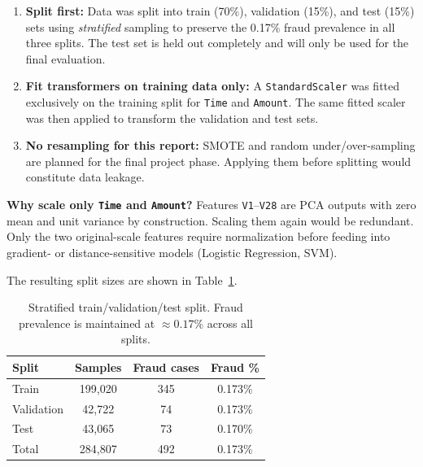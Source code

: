\documentclass[11pt, a4paper]{article}
\begin{document}
\begin{enumerate}[noitemsep]
    \item \textbf{Split first:} Data was split into train (70\%), validation (15\%), and
          test (15\%) sets using \textit{stratified} sampling to preserve the 0.17\% fraud
          prevalence in all three splits. The test set is held out completely and will only
          be used for the final evaluation.
    \item \textbf{Fit transformers on training data only:} A \texttt{StandardScaler} was
          fitted exclusively on the training split for \texttt{Time} and \texttt{Amount}.
          The same fitted scaler was then applied to transform the validation and test sets.
    \item \textbf{No resampling for this report:} SMOTE and random under/over-sampling are
          planned for the final project phase. Applying them before splitting would
          constitute data leakage.
\end{enumerate}

\noindent\textbf{Why scale only \texttt{Time} and \texttt{Amount}?}
Features \texttt{V1}--\texttt{V28} are PCA outputs with zero mean and unit variance by
construction. Scaling them again would be redundant. Only the two original-scale features
require normalization before feeding into gradient- or distance-sensitive models
(Logistic Regression, SVM).

\noindent The resulting split sizes are shown in Table~\ref{tab:splits}.

\begin{table}[h]
    \centering
    \caption{Stratified train/validation/test split. Fraud prevalence is maintained
             at $\approx 0.17\%$ across all splits.}
    \label{tab:splits}
    \begin{tabular}{lccc}
        \toprule
        \textbf{Split} & \textbf{Samples} & \textbf{Fraud cases} & \textbf{Fraud \%} \\
        \midrule
        Train      & 199,020 & 345 & 0.173\% \\
        Validation & 42,722  & 74  & 0.173\% \\
        Test       & 43,065  & 73  & 0.170\% \\
        \midrule
        Total      & 284,807 & 492 & 0.173\% \\
        \bottomrule
    \end{tabular}
\end{table}

\end{document}
